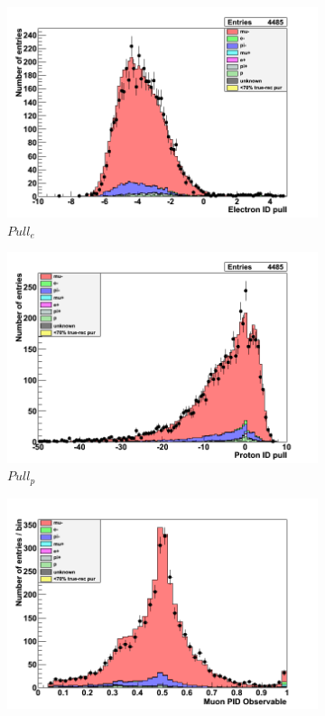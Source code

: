 \begin{figure}[!h]
	\begin{subfigure}[t]{0.32\textwidth}
		\includegraphics[width=\textwidth]{figures/numu/Cuts/numu/Elepull_run12}
		\caption{$Pull_e$}
	\end{subfigure}
	\begin{subfigure}[t]{0.32\textwidth}	
		\includegraphics[width=\textwidth]{figures/numu/Cuts/numu/Protpull_run12}
		\caption{$Pull_p$}
	\end{subfigure}
	\begin{subfigure}[t]{0.32\textwidth}
		\includegraphics[width=\textwidth]{figures/numu/Cuts/numu/Mulikelihood_run2}

\end{subfigure}
\end{figure}
